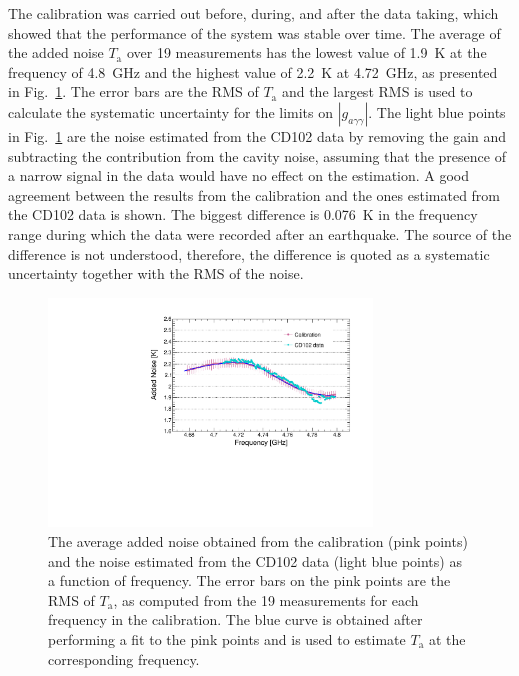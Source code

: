 \documentclass[%
reprint, %
superscriptaddress,
 amsmath,amssymb,
 aps
]{revtex4-2}
\begin{document}
The calibration was carried out before, during, and after the data taking, 
which showed that the performance of the system was stable over time. The 
average of the added noise $T_\text{a}$ over 19 measurements has the lowest 
value of 1.9~K at the frequency of 4.8~GHz and the highest value of 
2.2~K at 4.72~GHz, as presented in Fig.~\ref{fig:hemtcalvsf}. 
The error bars are the RMS of $T_\text{a}$ and the largest RMS is used to 
calculate the systematic uncertainty for the limits on 
$\left|g_{a\gamma\gamma}\right|$. The light blue points in 
Fig.~\ref{fig:hemtcalvsf} are the noise estimated from the CD102 data by 
removing the gain and subtracting the contribution from the cavity noise, 
assuming 
that the presence of a narrow signal in the data would have no effect on the 
estimation. A good agreement between the results from the calibration  
and the ones estimated from the CD102 data is shown. The biggest 
difference is 0.076~K in the frequency range during which the data were 
recorded after an earthquake. The source of the difference is not understood, 
therefore, the difference is quoted as a systematic uncertainty together 
with the RMS of the noise.

\begin{figure} [htbp]
  \centering
  \includegraphics[width=8.6cm]{Figure1.pdf}
  \caption{The average added noise obtained from the calibration (pink points)
 and the noise estimated from the CD102 data (light blue points) as a 
function of frequency. The error bars on the pink points are the RMS 
of $T_\text{a}$, as computed from the 19 measurements for each frequency 
in the calibration. 
The blue curve is obtained after performing a fit to 
the pink points and is used to estimate $T_\text{a}$ at the corresponding 
frequency.}
  \label{fig:hemtcalvsf}
\end{figure}


\end{document}
